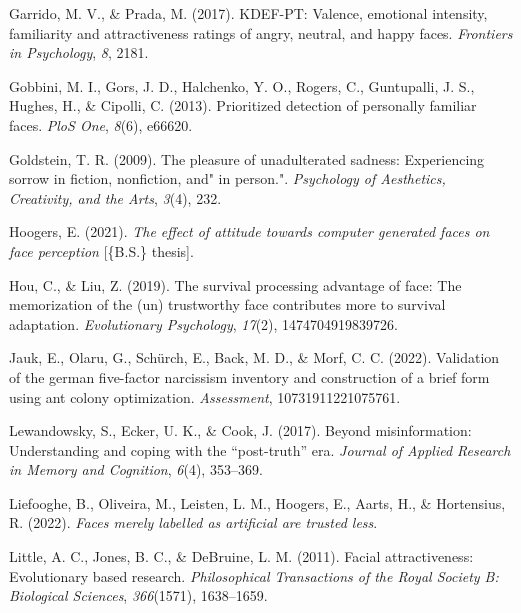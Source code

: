 \documentclass[
  man,floatsintext]{apa6}
\newlength{\cslhangindent}
\newlength{\cslentryspacingunit} %
\newenvironment{CSLReferences}[2] %
 {%
  \setlength{\parindent}{0pt}
  \ifodd #1
  \let\oldpar\par
  \def\par{\hangindent=\cslhangindent\oldpar}
  \fi
  \setlength{\parskip}{#2\cslentryspacingunit}
 }%
 {}
\begin{document}
\begin{CSLReferences}{1}{0}
\leavevmode{}%
Garrido, M. V., \& Prada, M. (2017). KDEF-PT: Valence, emotional intensity, familiarity and attractiveness ratings of angry, neutral, and happy faces. \emph{Frontiers in Psychology}, \emph{8}, 2181.

\leavevmode{}%
Gobbini, M. I., Gors, J. D., Halchenko, Y. O., Rogers, C., Guntupalli, J. S., Hughes, H., \& Cipolli, C. (2013). Prioritized detection of personally familiar faces. \emph{PloS One}, \emph{8}(6), e66620.

\leavevmode{}%
Goldstein, T. R. (2009). The pleasure of unadulterated sadness: Experiencing sorrow in fiction, nonfiction, and" in person.". \emph{Psychology of Aesthetics, Creativity, and the Arts}, \emph{3}(4), 232.

\leavevmode{}%
Hoogers, E. (2021). \emph{The effect of attitude towards computer generated faces on face perception} {[}\{B.S.\} thesis{]}.

\leavevmode{}%
Hou, C., \& Liu, Z. (2019). The survival processing advantage of face: The memorization of the (un) trustworthy face contributes more to survival adaptation. \emph{Evolutionary Psychology}, \emph{17}(2), 1474704919839726.

\leavevmode{}%
Jauk, E., Olaru, G., Schürch, E., Back, M. D., \& Morf, C. C. (2022). Validation of the german five-factor narcissism inventory and construction of a brief form using ant colony optimization. \emph{Assessment}, 10731911221075761.

\leavevmode{}%
Lewandowsky, S., Ecker, U. K., \& Cook, J. (2017). Beyond misinformation: Understanding and coping with the {``post-truth''} era. \emph{Journal of Applied Research in Memory and Cognition}, \emph{6}(4), 353--369.

\leavevmode{}%
Liefooghe, B., Oliveira, M., Leisten, L. M., Hoogers, E., Aarts, H., \& Hortensius, R. (2022). \emph{Faces merely labelled as artificial are trusted less}.

\leavevmode{}%
Little, A. C., Jones, B. C., \& DeBruine, L. M. (2011). Facial attractiveness: Evolutionary based research. \emph{Philosophical Transactions of the Royal Society B: Biological Sciences}, \emph{366}(1571), 1638--1659.


\end{CSLReferences}
\end{document}
